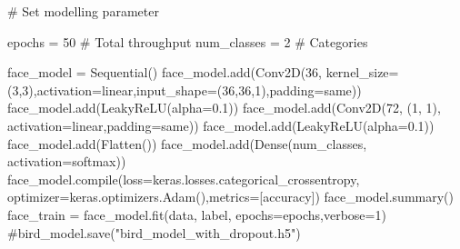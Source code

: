 \documentclass[
  letterpaper,
  DIV=11,
  numbers=noendperiod]{scrartcl}
\newenvironment{Shaded}{\begin{snugshade}}{\end{snugshade}}
\newcommand{\BuiltInTok}[1]{\textcolor[rgb]{0.00,0.23,0.31}{#1}}
\newcommand{\CommentTok}[1]{\textcolor[rgb]{0.37,0.37,0.37}{#1}}
\newcommand{\DecValTok}[1]{\textcolor[rgb]{0.68,0.00,0.00}{#1}}
\newcommand{\FloatTok}[1]{\textcolor[rgb]{0.68,0.00,0.00}{#1}}
\newcommand{\NormalTok}[1]{\textcolor[rgb]{0.00,0.23,0.31}{#1}}
\newcommand{\OperatorTok}[1]{\textcolor[rgb]{0.37,0.37,0.37}{#1}}
\newcommand{\StringTok}[1]{\textcolor[rgb]{0.13,0.47,0.30}{#1}}
\begin{document}
\begin{Shaded}
\begin{Highlighting}[]
\CommentTok{\# Set modelling parameter }

\NormalTok{epochs }\OperatorTok{=} \DecValTok{50}     \CommentTok{\# Total throughput }
\NormalTok{num\_classes }\OperatorTok{=} \DecValTok{2} \CommentTok{\# Categories}

\NormalTok{face\_model }\OperatorTok{=}\NormalTok{ Sequential()}
\NormalTok{face\_model.add(Conv2D(}\DecValTok{36}\NormalTok{, kernel\_size}\OperatorTok{=}\NormalTok{(}\DecValTok{3}\NormalTok{,}\DecValTok{3}\NormalTok{),activation}\OperatorTok{=}\StringTok{\textquotesingle{}linear\textquotesingle{}}\NormalTok{,input\_shape}\OperatorTok{=}\NormalTok{(}\DecValTok{36}\NormalTok{,}\DecValTok{36}\NormalTok{,}\DecValTok{1}\NormalTok{),padding}\OperatorTok{=}\StringTok{\textquotesingle{}same\textquotesingle{}}\NormalTok{))}
\NormalTok{face\_model.add(LeakyReLU(alpha}\OperatorTok{=}\FloatTok{0.1}\NormalTok{))}
\NormalTok{face\_model.add(Conv2D(}\DecValTok{72}\NormalTok{, (}\DecValTok{1}\NormalTok{, }\DecValTok{1}\NormalTok{), activation}\OperatorTok{=}\StringTok{\textquotesingle{}linear\textquotesingle{}}\NormalTok{,padding}\OperatorTok{=}\StringTok{\textquotesingle{}same\textquotesingle{}}\NormalTok{))}
\NormalTok{face\_model.add(LeakyReLU(alpha}\OperatorTok{=}\FloatTok{0.1}\NormalTok{))}
\NormalTok{face\_model.add(Flatten())  }
\NormalTok{face\_model.add(Dense(num\_classes, activation}\OperatorTok{=}\StringTok{\textquotesingle{}softmax\textquotesingle{}}\NormalTok{))}
\NormalTok{face\_model.}\BuiltInTok{compile}\NormalTok{(loss}\OperatorTok{=}\NormalTok{keras.losses.categorical\_crossentropy, optimizer}\OperatorTok{=}\NormalTok{keras.optimizers.Adam(),metrics}\OperatorTok{=}\NormalTok{[}\StringTok{\textquotesingle{}accuracy\textquotesingle{}}\NormalTok{])}
\NormalTok{face\_model.summary()}
\NormalTok{face\_train }\OperatorTok{=}\NormalTok{ face\_model.fit(data, label, epochs}\OperatorTok{=}\NormalTok{epochs,verbose}\OperatorTok{=}\DecValTok{1}\NormalTok{)}
\CommentTok{\#bird\_model.save("bird\_model\_with\_dropout.h5")}
\end{Highlighting}
\end{Shaded}
\end{document}
